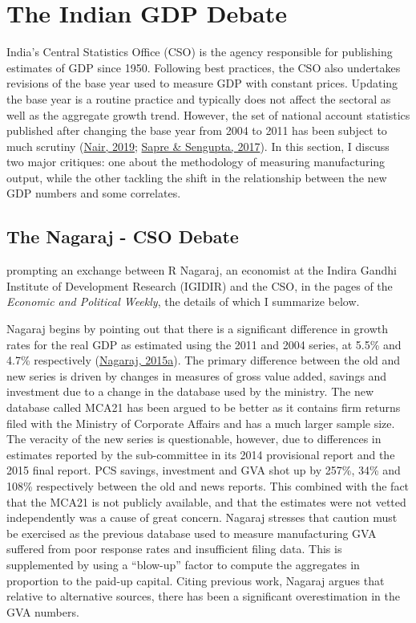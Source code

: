 \documentclass[12pt,nobind, a4paper]{reedthesis}
\begin{document}
 \hypertarget{the-indian-gdp-debate}{%
 \section{The Indian GDP Debate}\label{the-indian-gdp-debate}}

 India's Central Statistics Office (CSO) is the agency responsible for publishing estimates of GDP since 1950. Following best practices, the CSO also undertakes revisions of the base year used to measure GDP with constant prices. Updating the base year is a routine practice and typically does not affect the sectoral as well as the aggregate growth trend. However, the set of national account statistics published after changing the base year from 2004 to 2011 has been subject to much scrutiny (\protect\hyperlink{ref-nair_base_2019}{Nair, 2019}; \protect\hyperlink{ref-sapre_analysis_2017}{Sapre \& Sengupta, 2017}). In this section, I discuss two major critiques: one about the methodology of measuring manufacturing output, while the other tackling the shift in the relationship between the new GDP numbers and some correlates.

 \hypertarget{the-nagaraj---cso-debate}{%
 \subsection{The Nagaraj - CSO Debate}\label{the-nagaraj---cso-debate}}

 prompting an exchange between R Nagaraj, an economist at the Indira Gandhi Institute of Development Research (IGIDIR) and the CSO, in the pages of the \emph{Economic and Political Weekly}, the details of which I summarize below.
 \linebreak

 Nagaraj begins by pointing out that there is a significant difference in growth rates for the real GDP as estimated using the 2011 and 2004 series, at 5.5\% and 4.7\% respectively (\protect\hyperlink{ref-nagaraj_seeds_2015-1}{Nagaraj, 2015a}). The primary difference between the old and new series is driven by changes in measures of gross value added, savings and investment due to a change in the database used by the ministry. The new database called MCA21 has been argued to be better as it contains firm returns filed with the Ministry of Corporate Affairs and has a much larger sample size. The veracity of the new series is questionable, however, due to differences in estimates reported by the sub-committee in its 2014 provisional report and the 2015 final report. PCS savings, investment and GVA shot up by 257\%, 34\% and 108\% respectively between the old and news reports. This combined with the fact that the MCA21 is not publicly available, and that the estimates were not vetted independently was a cause of great concern. Nagaraj stresses that caution must be exercised as the previous database used to measure manufacturing GVA suffered from poor response rates and insufficient filing data. This is supplemented by using a ``blow-up'' factor to compute the aggregates in proportion to the paid-up capital. Citing previous work, Nagaraj argues that relative to alternative sources, there has been a significant overestimation in the GVA numbers.
 \linebreak
\end{document}
